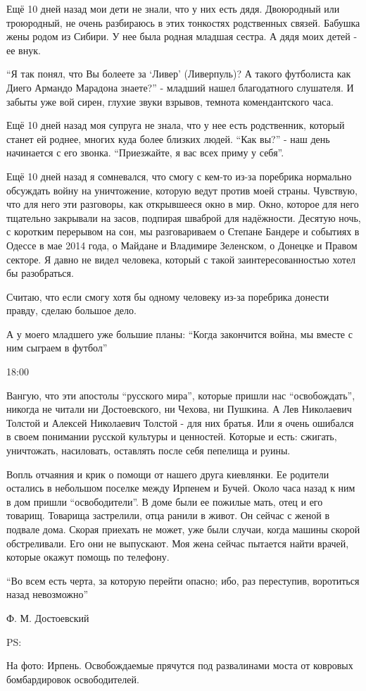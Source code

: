 Ещё 10 дней назад мои дети не знали, что у них есть дядя. Двоюродный или
троюродный, не очень разбираюсь в этих тонкостях родственных связей. Бабушка
жены родом из Сибири. У нее была родная младшая сестра. А дядя моих детей - ее
внук. 

\enquote{Я так понял, что Вы болеете за \enquote{Ливер} (Ливерпуль)? А такого
футболиста как Диего Армандо Марадона знаете?} - младший нашел благодатного
слушателя. И забыты уже вой сирен, глухие звуки взрывов, темнота комендантского
часа.

Ещё 10 дней назад моя супруга не знала, что у нее есть родственник, который
станет ей роднее, многих куда более близких людей. \enquote{Как вы?} - наш день
начинается с его звонка. \enquote{Приезжайте, я вас всех приму у себя}.

Ещё 10 дней назад я сомневался, что смогу с кем-то из-за поребрика нормально
обсуждать войну на уничтожение, которую ведут против моей страны. Чувствую, что
для него эти разговоры, как открывшееся окно в мир. Окно, которое для него
тщательно закрывали на засов, подпирая шваброй для надёжности. Десятую ночь, с
коротким перерывом на сон, мы разговариваем о Степане Бандере и событиях в
Одессе в мае 2014 года, о Майдане и Владимире Зеленском, о Донецке и Правом
секторе. Я давно не видел человека, который с такой заинтересованностью хотел
бы разобраться. 

Считаю, что если смогу хотя бы одному человеку из-за поребрика донести правду,
сделаю большое дело.

А у моего младшего уже большие планы: \enquote{Когда закончится война, мы вместе с ним
сыграем в футбол} 

18:00

Вангую, что эти апостолы \enquote{русского мира}, которые пришли нас \enquote{освобождать},
никогда не читали ни Достоевского, ни Чехова, ни Пушкина. А Лев Николаевич
Толстой и Алексей Николаевич Толстой - для них братья. Или я очень ошибался в
своем понимании русской культуры и ценностей. Которые и есть: сжигать,
уничтожать, насиловать, оставлять после себя пепелища и руины.

Вопль отчаяния и крик о помощи от нашего друга киевлянки. Ее родители остались
в небольшом поселке между Ирпенем и Бучей. Около часа назад к ним в дом пришли
\enquote{освободители}. В доме были ее пожилые мать, отец и его товарищ. Товарища
застрелили, отца ранили в живот. Он сейчас с женой в подвале дома. Скорая
приехать не может, уже были случаи, когда машины скорой обстреливали. Его они
не выпускают. Моя жена сейчас пытается найти врачей, которые окажут помощь по
телефону.

\enquote{Во всем есть черта, за которую перейти опасно; ибо, раз переступив, воротиться
назад невозможно}

Ф. М. Достоевский

PS:

На фото: Ирпень. Освобождаемые прячутся под развалинами моста от ковровых
бомбардировок освободителей.
